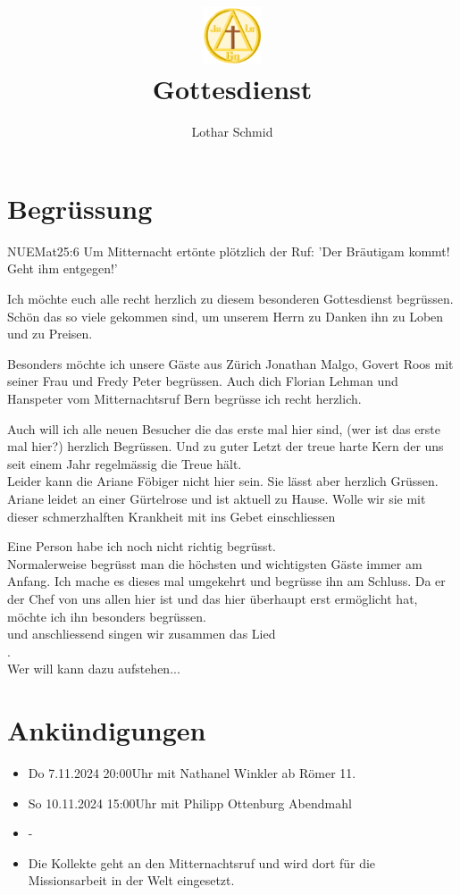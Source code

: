 \documentclass{../inc/mybib}
\title{\includegraphics[height=48pt]{../assets/images/logo.png}\\Gottesdienst}
\author{Lothar Schmid}
\begin{document}
\maketitle
\section{Begrüssung}

\begin{bibelbox}{NUE}{Mat}{25:6}
Um Mitternacht ertönte plötzlich der Ruf: 'Der Bräutigam kommt! Geht ihm entgegen!'
\end{bibelbox}
Ich möchte euch alle recht herzlich zu diesem besonderen Gottesdienst begrüssen. Schön das so viele gekommen sind, um unserem Herrn zu Danken ihn zu Loben und zu Preisen.

Besonders möchte ich unsere Gäste aus Zürich Jonathan Malgo, Govert Roos mit seiner Frau  und Fredy Peter begrüssen. Auch dich Florian Lehman und Hanspeter vom Mitternachtsruf Bern begrüsse ich recht herzlich.

Auch will ich alle neuen Besucher die das erste mal hier sind, (wer ist das erste mal hier?) herzlich Begrüssen. Und zu guter Letzt der treue harte Kern der uns seit einem Jahr regelmässig die Treue hält.\\
Leider kann die Ariane Föbiger nicht hier sein. Sie lässt aber herzlich Grüssen. Ariane leidet an einer Gürtelrose und ist aktuell zu Hause. Wolle wir sie mit dieser schmerzhalften Krankheit mit ins Gebet einschliessen 

Eine Person habe ich noch nicht richtig begrüsst. \\
Normalerweise begrüsst man die höchsten und wichtigsten Gäste immer am Anfang. Ich mache es dieses mal umgekehrt und begrüsse ihn am Schluss. Da er der Chef von uns allen hier ist und das hier überhaupt erst ermöglicht hat, möchte ich ihn besonders begrüssen.\\
\beten{} und anschliessend singen wir zusammen das Lied\\
.\\
Wer will kann dazu aufstehen...

\section{Ankündigungen}
\begin{itemize}
    \item {} Do 7.11.2024 20:00Uhr mit Nathanel Winkler ab Römer 11.
    \item {} So 10.11.2024 15:00Uhr mit Philipp Ottenburg Abendmahl
    \item {} -
    \item {} Die Kollekte geht an den Mitternachtsruf und wird dort für die Missionsarbeit in der Welt eingesetzt.
\end{itemize}
\end{document}
